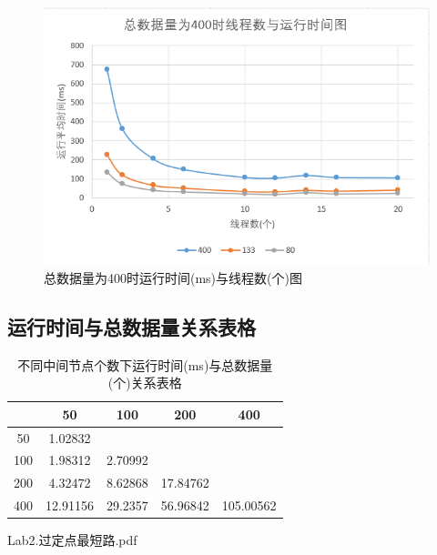 \documentclass[UTF8]{ctexart}
\begin{document}
\begin{figure}[H]
    \centering
    \includegraphics[scale=0.7]{400.png}
    \caption{总数据量为400时运行时间(ms)与线程数(个)图}
\end{figure}
\clearpage
\subsection{运行时间与总数据量关系表格}
\begin{table}[H]
    \centering
    \begin{tabular}{|c|c|c|c|c|}
        \hline
                &50&	100&	200&	400\\
                \hline
        50&	    1.02832	&		& & \\
        \hline
        100&	1.98312&	2.70992	&	& \\
        \hline
        200&	4.32472&	8.62868&	17.84762&	\\
        \hline
        400&	12.91156&	29.2357&	56.96842&	105.00562\\      
        \hline
    \end{tabular}
    \caption{不同中间节点个数下运行时间(ms)与总数据量(个)关系表格}
\end{table}
\clearpage
\begin{thebibliography}{99}
    Lab2.过定点最短路.pdf
\end{thebibliography}
\end{document}
